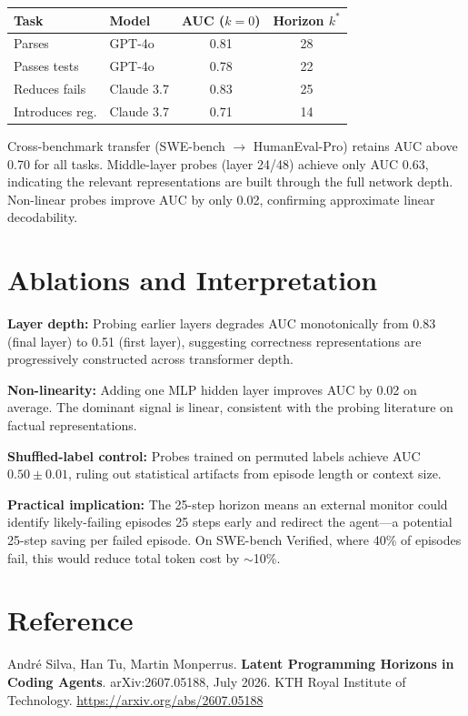 \documentclass[10pt,twocolumn]{article}
\begin{document}
\begin{center}
\small
\begin{tabular}{llcc}
\toprule
Task & Model & AUC ($k{=}0$) & Horizon $k^*$ \\
\midrule
Parses & GPT-4o & 0.81 & 28 \\
Passes tests & GPT-4o & 0.78 & 22 \\
Reduces fails & Claude 3.7 & 0.83 & 25 \\
Introduces reg. & Claude 3.7 & 0.71 & 14 \\
\bottomrule
\end{tabular}
\end{center}

Cross-benchmark transfer (SWE-bench $\to$ HumanEval-Pro) retains
AUC above 0.70 for all tasks. Middle-layer probes (layer 24/48)
achieve only AUC 0.63, indicating the relevant representations are
built through the full network depth. Non-linear probes improve
AUC by only 0.02, confirming approximate linear decodability.

\section{Ablations and Interpretation}

\textbf{Layer depth:} Probing earlier layers degrades AUC monotonically
from 0.83 (final layer) to 0.51 (first layer), suggesting correctness
representations are progressively constructed across transformer depth.

\textbf{Non-linearity:} Adding one MLP hidden layer improves AUC by
0.02 on average. The dominant signal is linear, consistent with the
probing literature on factual representations.

\textbf{Shuffled-label control:} Probes trained on permuted labels
achieve AUC $0.50 \pm 0.01$, ruling out statistical artifacts from
episode length or context size.

\textbf{Practical implication:} The 25-step horizon means an
external monitor could identify likely-failing episodes 25 steps
early and redirect the agent---a potential 25-step saving per
failed episode. On SWE-bench Verified, where 40\% of episodes fail,
this would reduce total token cost by $\sim$10\%.

\section*{Reference}

Andr\'e Silva, Han Tu, Martin Monperrus.
\textbf{Latent Programming Horizons in Coding Agents}.
arXiv:2607.05188, July 2026. KTH Royal Institute of Technology.
\url{https://arxiv.org/abs/2607.05188}
\end{document}
